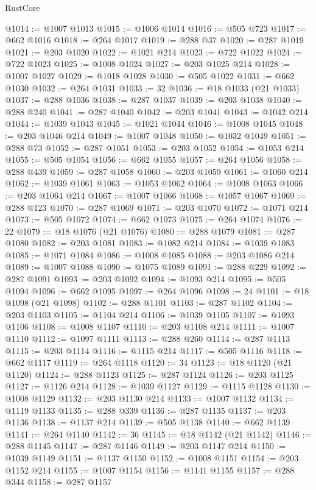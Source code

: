 \begin{lexlean}{RustCore}
\begin{coremodule}
@1014 := @1007 @1013
@1015 := @1006 @1014
@1016 := @505 @723
@1017 := @662 @1016
@1018 := @264 @1017
@1019 := @288 @37
@1020 := @287 @1019
@1021 := @203 @1020
@1022 := @1021 @214
@1023 := @722 @1022
@1024 := @722 @1023
@1025 := @1008 @1024
@1027 := @203 @1025 @214
@1028 := @1007 @1027
@1029 := @1018 @1028
@1030 := @505 @1022
@1031 := @662 @1030
@1032 := @264 @1031
@1033 := 32
@1036 := @18 @1033 (@21 @1033)
@1037 := @288 @1036
@1038 := @287 @1037
@1039 := @203 @1038
@1040 := @288 @240
@1041 := @287 @1040
@1042 := @203 @1041
@1043 := @1042 @214
@1044 := @1039 @1043
@1045 := @1021 @1044
@1046 := @1008 @1045
@1048 := @203 @1046 @214
@1049 := @1007 @1048
@1050 := @1032 @1049
@1051 := @288 @73
@1052 := @287 @1051
@1053 := @203 @1052
@1054 := @1053 @214
@1055 := @505 @1054
@1056 := @662 @1055
@1057 := @264 @1056
@1058 := @288 @439
@1059 := @287 @1058
@1060 := @203 @1059
@1061 := @1060 @214
@1062 := @1039 @1061
@1063 := @1053 @1062
@1064 := @1008 @1063
@1066 := @203 @1064 @214
@1067 := @1007 @1066
@1068 := @1057 @1067
@1069 := @288 @123
@1070 := @287 @1069
@1071 := @203 @1070
@1072 := @1071 @214
@1073 := @505 @1072
@1074 := @662 @1073
@1075 := @264 @1074
@1076 := 22
@1079 := @18 @1076 (@21 @1076)
@1080 := @288 @1079
@1081 := @287 @1080
@1082 := @203 @1081
@1083 := @1082 @214
@1084 := @1039 @1083
@1085 := @1071 @1084
@1086 := @1008 @1085
@1088 := @203 @1086 @214
@1089 := @1007 @1088
@1090 := @1075 @1089
@1091 := @288 @229
@1092 := @287 @1091
@1093 := @203 @1092
@1094 := @1093 @214
@1095 := @505 @1094
@1096 := @662 @1095
@1097 := @264 @1096
@1098 := 24
@1101 := @18 @1098 (@21 @1098)
@1102 := @288 @1101
@1103 := @287 @1102
@1104 := @203 @1103
@1105 := @1104 @214
@1106 := @1039 @1105
@1107 := @1093 @1106
@1108 := @1008 @1107
@1110 := @203 @1108 @214
@1111 := @1007 @1110
@1112 := @1097 @1111
@1113 := @288 @260
@1114 := @287 @1113
@1115 := @203 @1114
@1116 := @1115 @214
@1117 := @505 @1116
@1118 := @662 @1117
@1119 := @264 @1118
@1120 := 34
@1123 := @18 @1120 (@21 @1120)
@1124 := @288 @1123
@1125 := @287 @1124
@1126 := @203 @1125
@1127 := @1126 @214
@1128 := @1039 @1127
@1129 := @1115 @1128
@1130 := @1008 @1129
@1132 := @203 @1130 @214
@1133 := @1007 @1132
@1134 := @1119 @1133
@1135 := @288 @339
@1136 := @287 @1135
@1137 := @203 @1136
@1138 := @1137 @214
@1139 := @505 @1138
@1140 := @662 @1139
@1141 := @264 @1140
@1142 := 36
@1145 := @18 @1142 (@21 @1142)
@1146 := @288 @1145
@1147 := @287 @1146
@1149 := @203 @1147 @214
@1150 := @1039 @1149
@1151 := @1137 @1150
@1152 := @1008 @1151
@1154 := @203 @1152 @214
@1155 := @1007 @1154
@1156 := @1141 @1155
@1157 := @288 @344
@1158 := @287 @1157

\end{coremodule}
\end{lexlean}
